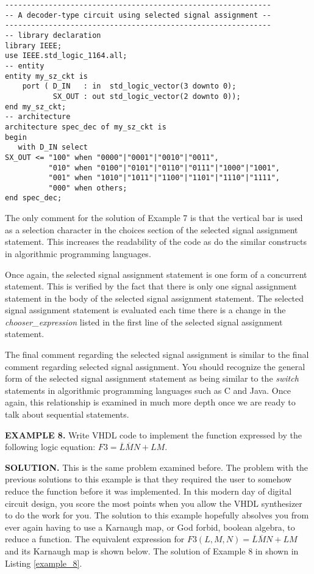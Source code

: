\noindent
\begin{minipage}{0.99\linewidth}
\begin{lstlisting}[label=example_7, caption=Solution of Example 7.]
-------------------------------------------------------------
-- A decoder-type circuit using selected signal assignment --
-------------------------------------------------------------
-- library declaration
library IEEE;
use IEEE.std_logic_1164.all;
-- entity
entity my_sz_ckt is
    port ( D_IN   : in  std_logic_vector(3 downto 0);
           SX_OUT : out std_logic_vector(2 downto 0)); 
end my_sz_ckt;
-- architecture
architecture spec_dec of my_sz_ckt is
begin
   with D_IN select
SX_OUT <= "100" when "0000"|"0001"|"0010"|"0011", 
          "010" when "0100"|"0101"|"0110"|"0111"|"1000"|"1001", 
          "001" when "1010"|"1011"|"1100"|"1101"|"1110"|"1111", 
          "000" when others;  
end spec_dec;
\end{lstlisting}
\end{minipage}

The only comment for the solution of Example 7 is that the vertical bar is used as a selection character in the choices section of the selected signal assignment statement. This increases the readability of the code as do the similar constructs in algorithmic programming languages.

Once again, the selected signal assignment statement is one form of a concurrent statement. This is verified by the fact that there is only one signal assignment statement in the body of the selected signal assignment statement. The selected signal assignment statement is evaluated each time there is a change in the \textit{chooser\_expression} listed in the first line of the selected signal assignment statement.

The final comment regarding the selected signal assignment is similar to the final comment regarding selected signal assignment. You should recognize the general form of the selected signal assignment statement as being similar to the \textit{switch} statements in algorithmic programming languages such as C and Java. Once again, this relationship is examined in much more depth once we are ready to talk about sequential statements.

\begin{leftbar}
\noindent
\textbf{EXAMPLE 8.}
Write VHDL code to implement the function expressed by the following logic equation: $F3=\overline{L}\overline{M}N+LM$.
\end{leftbar}
\noindent
\textbf{SOLUTION.} This is the same problem examined before. The problem with the previous solutions to this example is that they required the user to somehow reduce the function before it was implemented. In this modern day of digital circuit design, you score the most points when you allow the VHDL synthesizer to do the work for you. The solution to this example hopefully absolves you from ever again having to use a Karnaugh map, or God forbid, boolean algebra, to reduce a function. The equivalent expression for $F3(L,M,N)=\overline{L}\overline{M}N+LM$ and its Karnaugh map is shown below. The solution of Example 8 in shown in Listing \ref{example_8}.\\
\vspace{5pt}

